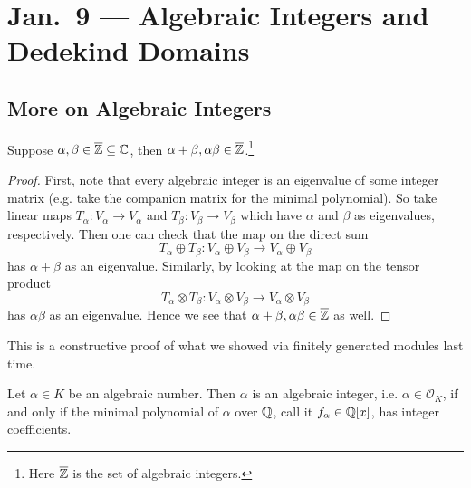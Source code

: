 \chapter{Jan.~9 --- Algebraic Integers and Dedekind Domains}

\section{More on Algebraic Integers}
\begin{prop}
  Suppose $\alpha, \beta \in \overline{\mathbb{Z}} \subseteq \mathbb{C}$,
  then
  $\alpha + \beta, \alpha \beta \in \overline{\mathbb{Z}}$.\footnote{Here $\overline{\mathbb{Z}}$ is the set of algebraic integers.}
\end{prop}

\begin{proof}
  First, note that every algebraic integer is an
  eigenvalue of some integer matrix (e.g. take the
  companion matrix for the minimal polynomial).
  So take linear maps $T_\alpha : V_\alpha \to V_\alpha$
  and $T_\beta : V_\beta \to V_\beta$ which have
  $\alpha$ and $\beta$ as eigenvalues, respectively.
  Then one can check that the map on the direct sum
  \[
    T_\alpha \oplus T_\beta : V_\alpha \oplus V_\beta \to V_\alpha \oplus V_\beta
  \]
  has $\alpha + \beta$ as an eigenvalue. Similarly,
  by looking at the map on the tensor product
  \[
    T_\alpha \otimes T_\beta : V_\alpha \otimes V_\beta \to V_\alpha \otimes V_\beta
  \]
  has $\alpha \beta$ as an eigenvalue. Hence we see
  that
  $\alpha + \beta, \alpha \beta \in \overline{\mathbb{Z}}$ as
  well.
\end{proof}

\begin{remark}
  This is a constructive proof of what we showed via
  finitely generated modules last time.
\end{remark}

\begin{lemma}
  Let $\alpha \in K$ be an algebraic number. Then
  $\alpha$ is an algebraic integer, i.e.
  $\alpha \in \mathcal{O}_K$, if and only if the
  minimal polynomial of $\alpha$ over $\mathbb{Q}$, call it
  $f_\alpha \in \mathbb{Q}[x]$, has integer coefficients.
\end{lemma}

